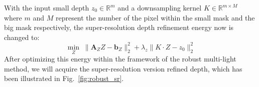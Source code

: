 With the input small depth $z_0\in\mathbb{R}^m$ and a downsampling kernel $K \in \mathbb{R}^{m\times M}$ where $m$ and $M$ represent the number of the pixel within the small mask and the big mask respectively, the super-resolution depth refinement energy now is changed to:
 \begin{equation}\label{eq:robust_depth_estimate}
    \min_{Z} \; \lVert  \mathbf{A}_{Z}Z - \mathbf{b}_Z\rVert^2_2 + \lambda_{z}\lVert K\cdot Z - z_0 \rVert_2^2
\end{equation}
 After optimizing this energy within the framework of the robust multi-light method, we will acquire the super-resolution version refined depth, which has been illustrated in Fig.~\ref{fig:robust_sr}.
  \begin{figure}[!ht]
\centering
{}

\end{figure}

